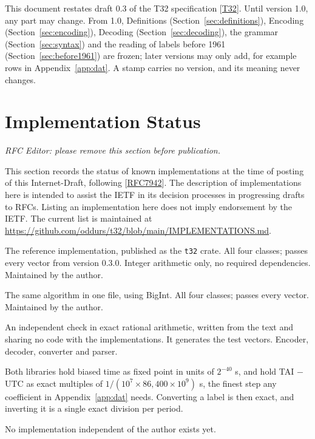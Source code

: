 \documentclass[11pt]{article}
\newcommand{\lit}[1]{\texttt{#1}}
\newcommand{\pow}[2]{\ensuremath{#1^{#2}}}
\newcommand{\Sec}[1]{Section~\ref{#1}}
\newcommand{\App}[1]{Appendix~\ref{#1}}
\newcommand{\xref}[1]{[\hyperref[ref:#1]{#1}]}
\begin{document}
This document restates draft 0.3 of the T32 specification \xref{T32}. Until
version 1.0, any part may change. From 1.0, Definitions
(\Sec{sec:definitions}), Encoding (\Sec{sec:encoding}), Decoding
(\Sec{sec:decoding}), the grammar (\Sec{sec:syntax}) and the reading of
labels before 1961 (\Sec{sec:before1961}) are frozen; later versions may only
add, for example rows in \App{app:dat}. A stamp carries no version, and its
meaning never changes.

\section{Implementation Status}\label{sec:impl}

\emph{RFC Editor: please remove this section before publication.}

This section records the status of known implementations at the time of
posting of this Internet-Draft, following \xref{RFC7942}. The description of
implementations here is intended to assist the IETF in its decision processes
in progressing drafts to RFCs. Listing an implementation here does not imply
endorsement by the IETF. The current list is maintained at
\url{https://github.com/oddurs/t32/blob/main/IMPLEMENTATIONS.md}.

\begin{description}[style=nextline,leftmargin=1.5em]
\item[\lit{t32} (Rust)] The reference implementation, published as the
\lit{t32} crate. All four classes; passes every vector from version 0.3.0. Integer arithmetic
only, no required dependencies. Maintained by the author.
\item[\lit{t32.ts} (TypeScript)] The same algorithm in one file, using BigInt.
All four classes; passes every vector. Maintained by the author.
\item[\lit{oracle.py} (Python)] An independent check in exact rational
arithmetic, written from the text and sharing no code with the
implementations. It generates the test vectors. Encoder, decoder, converter
and parser.
\end{description}

Both libraries hold biased time as fixed point in units of \pow{2}{-40} s, and
hold TAI $-$ UTC as exact multiples of $1/(10^7 \times 86{,}400 \times 10^9)$
s, the finest step any coefficient in \App{app:dat} needs. Converting a label
is then exact, and inverting it is a single exact division per period.

No implementation independent of the author exists yet.
\end{document}
